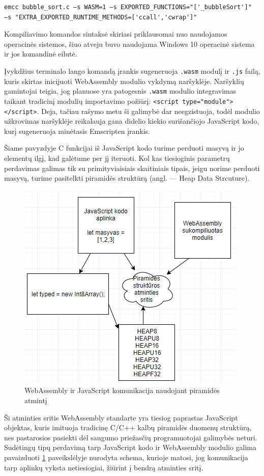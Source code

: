 \documentclass{VUMIFPSkursinis}
\begin{document}
\begin{center}
\begin{small}
\begin{verbatim}
emcc bubble_sort.c —s WASM=1 —s EXPORTED_FUNCTIONS="['_bubbleSort']" 
—s "EXTRA_EXPORTED_RUNTIME_METHODS=['ccall','cwrap']"
\end{verbatim}
\end{small}
\end{center}
Kompiliavimo komandos sintaksė skiriasi priklausomai nuo naudojamos operacinės sistemos, šiuo atveju buvo naudojama Windows 10 operacinė sistema ir jos komandinė eilutė.

Įvykdžius terminalo lango komandą įrankis sugeneruoja \verb|.wasm| modulį ir \verb|.js| failą, kuris skirtas inicijuoti WebAssembly modulio vykdymą naršyklėje. Naršyklių gamintojai teigia, jog planuose yra patogesnis \verb|.wasm| modulio integravimas taikant tradicinį modulių importavimo požiūrį: \verb|<script type="module"></script>|. Deja, tačiau rašymo metu ši galimybė dar neegzistuoja, todėl modulio užkrovimas naršyklėje reikalauja gana didelio kiekio surišančiojo JavaScript kodo, kurį sugeneruoja minėtasis Emscripten įrankis.

Šiame pavyzdyje C funkcijai iš JavaScript kodo turime perduoti masyvą ir jo elementų ilgį, kad galėtume per jį iteruoti. Kol kas tiesioginis parametrų perdavimas galimas tik su primityviaisiais skaitiniais tipais, jeigu norime perduoti masyvą, turime pasitelkti piramidės struktūrą (angl. — Heap Data Strcuture). 
\begin{figure}[h!]
  \begin{center}
  \includegraphics[scale=1]{wasm_heap.png}
  \end{center}
  \caption{WebAssembly ir JavaScript komunikacija naudojant piramidės atmintį}
  \label{fig:wasm_stack}
\end{figure}
Ši atminties sritis WebAssembly standarte yra tiesiog paprastas JavaScript objektas, kuris imituoja tradicinę C/C++ kalbų piramidės duomenų struktūrą, nes pastarosios pasiekti dėl saugumo priežasčių programuotojai galimybės neturi. 
Sudėtingų tipų perdavimą tarp JavaScript kodo ir WebAssembly modulio galima pavaizduoti \ref{fig:wasm_stack} paveikslėlyje nurodyta schema, kurioje matosi, jog komunikacija tarp aplinkų vyksta netiesiogiai, žiūrint į bendrą atminties sritį.
\end{document}
